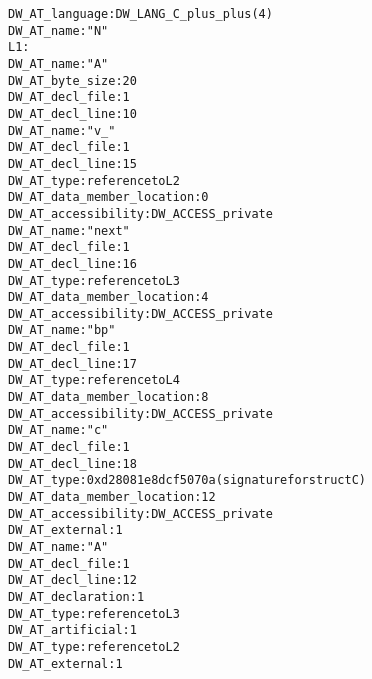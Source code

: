 \begin{alltt}
      DW\-\_AT\-\_language: DW\-\_LANG\-\_C\-\_plus\-\_plus (4)
          DW\-\_AT\-\_name : "N"
L1:
             DW\-\_AT\-\_name : "A"
             DW\-\_AT\-\_byte\-\_size : 20
             DW\-\_AT\-\_decl\-\_file : 1
             DW\-\_AT\-\_decl\-\_line : 10
                DW\-\_AT\-\_name : "v\_"
                DW\-\_AT\-\_decl\-\_file : 1
                DW\-\_AT\-\_decl\-\_line : 15
                DW\-\_AT\-\_type : reference to L2
                DW\-\_AT\-\_data\-\_member\-\_location : 0
                DW\-\_AT\-\_accessibility : DW\-\_ACCESS\-\_private
               DW\-\_AT\-\_name : "next"
               DW\-\_AT\-\_decl\-\_file : 1
               DW\-\_AT\-\_decl\-\_line : 16
               DW\-\_AT\-\_type : reference to L3
               DW\-\_AT\-\_data\-\_member\-\_location : 4
               DW\-\_AT\-\_accessibility : DW\-\_ACCESS\-\_private
               DW\-\_AT\-\_name : "bp"
               DW\-\_AT\-\_decl\-\_file : 1
               DW\-\_AT\-\_decl\-\_line : 17
               DW\-\_AT\-\_type : reference to L4
               DW\-\_AT\-\_data\-\_member\-\_location : 8
               DW\-\_AT\-\_accessibility : DW\-\_ACCESS\-\_private
               DW\-\_AT\-\_name : "c"
               DW\-\_AT\-\_decl\-\_file : 1
               DW\-\_AT\-\_decl\-\_line : 18
               DW\-\_AT\-\_type : 0xd28081e8 dcf5070a (signature for struct C)
               DW\-\_AT\-\_data\-\_member\-\_location : 12
               DW\-\_AT\-\_accessibility : DW\-\_ACCESS\-\_private
           DW\-\_AT\-\_external : 1
           DW\-\_AT\-\_name : "A"
           DW\-\_AT\-\_decl\-\_file : 1
           DW\-\_AT\-\_decl\-\_line : 12
           DW\-\_AT\-\_declaration : 1
           DW\-\_AT\-\_type : reference to L3
           DW\-\_AT\-\_artificial : 1
           DW\-\_AT\-\_type : reference to L2
           DW\-\_AT\-\_external : 1

\end{alltt}
